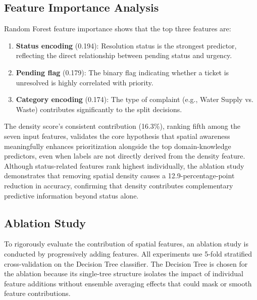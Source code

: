 \documentclass[conference]{IEEEtran}
\begin{document}
\subsection{Feature Importance Analysis}

Random Forest feature importance shows that the top three features are:
\begin{enumerate}
    \item \textbf{Status encoding} (0.194): Resolution status is the strongest predictor, reflecting the direct relationship between pending status and urgency.
    \item \textbf{Pending flag} (0.179): The binary flag indicating whether a ticket is unresolved is highly correlated with priority.
    \item \textbf{Category encoding} (0.174): The type of complaint (e.g., Water Supply vs. Waste) contributes significantly to the split decisions.
\end{enumerate}

The density score's consistent contribution (16.3\%), ranking fifth among the seven input features, validates the core hypothesis that spatial awareness meaningfully enhances prioritization alongside the top domain-knowledge predictors, even when labels are not directly derived from the density feature. Although status-related features rank highest individually, the ablation study demonstrates that removing spatial density causes a 12.9-percentage-point reduction in accuracy, confirming that density contributes complementary predictive information beyond status alone.

\subsection{Ablation Study}

To rigorously evaluate the contribution of spatial features, an ablation study is conducted by progressively adding features. All experiments use 5-fold stratified cross-validation on the Decision Tree classifier. The Decision Tree is chosen for the ablation because its single-tree structure isolates the impact of individual feature additions without ensemble averaging effects that could mask or smooth feature contributions.

\begin{table}[h]
\centering
\caption{Ablation Study --- Impact of Spatial Features}
\label{tab:ablation}
\end{table}
\end{document}
